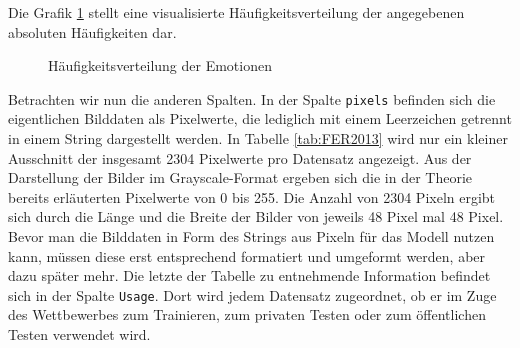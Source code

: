 \documentclass[12pt, a4paper]{report}
\begin{document}
Die Grafik \ref{fig:visualisierungferemotions} stellt eine visualisierte Häufigkeitsverteilung der angegebenen absoluten Häufigkeiten dar.
\begin{figure}[H]
  \centering
{}
  \caption{Häufigkeitsverteilung der Emotionen}
  \label{fig:visualisierungferemotions}
\end{figure}
Betrachten wir nun die anderen Spalten. In der Spalte \texttt{pixels} befinden sich die eigentlichen Bilddaten als Pixelwerte, die lediglich mit einem Leerzeichen getrennt in einem String dargestellt werden. In Tabelle \ref{tab:FER2013} wird nur ein kleiner Ausschnitt der insgesamt 2304 Pixelwerte pro Datensatz angezeigt. Aus der Darstellung der Bilder im Grayscale-Format ergeben sich die in der Theorie bereits erläuterten Pixelwerte von 0 bis 255. Die Anzahl von 2304 Pixeln ergibt sich durch die Länge und die Breite der Bilder von jeweils 48 Pixel mal 48 Pixel. Bevor man die Bilddaten in Form des Strings aus Pixeln für das Modell nutzen kann, müssen diese erst entsprechend formatiert und umgeformt werden, aber dazu später mehr. Die letzte der Tabelle zu entnehmende Information befindet sich in der Spalte \texttt{Usage}. Dort wird jedem Datensatz zugeordnet, ob er im Zuge des Wettbewerbes zum Trainieren, zum privaten Testen oder zum öffentlichen Testen verwendet wird.
\end{document}

